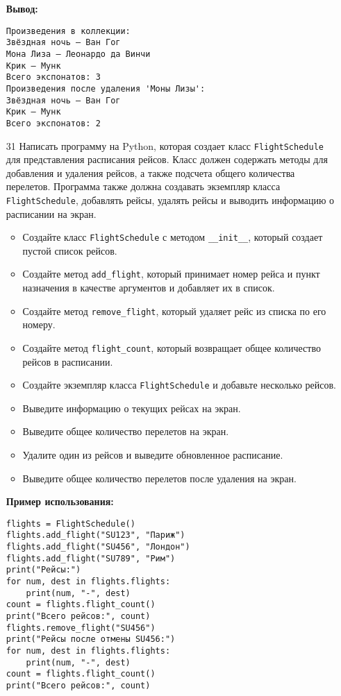 \begin{enumerate}
\textbf{Вывод:}
\begin{verbatim}
Произведения в коллекции:
Звёздная ночь — Ван Гог
Мона Лиза — Леонардо да Винчи
Крик — Мунк
Всего экспонатов: 3
Произведения после удаления 'Моны Лизы':
Звёздная ночь — Ван Гог
Крик — Мунк
Всего экспонатов: 2
\end{verbatim}

\item[31] Написать программу на Python, которая создает класс \texttt{FlightSchedule} для представления расписания рейсов. Класс должен содержать методы для добавления и удаления рейсов, а также подсчета общего количества перелетов. Программа также должна создавать экземпляр класса \texttt{FlightSchedule}, добавлять рейсы, удалять рейсы и выводить информацию о расписании на экран.

\begin{itemize}
    \item Создайте класс \texttt{FlightSchedule} с методом \texttt{\_\_init\_\_}, который создает пустой список рейсов.
    \item Создайте метод \texttt{add\_flight}, который принимает номер рейса и пункт назначения в качестве аргументов и добавляет их в список.
    \item Создайте метод \texttt{remove\_flight}, который удаляет рейс из списка по его номеру.
    \item Создайте метод \texttt{flight\_count}, который возвращает общее количество рейсов в расписании.
    \item Создайте экземпляр класса \texttt{FlightSchedule} и добавьте несколько рейсов.
    \item Выведите информацию о текущих рейсах на экран.
    \item Выведите общее количество перелетов на экран.
    \item Удалите один из рейсов и выведите обновленное расписание.
    \item Выведите общее количество перелетов после удаления на экран.
\end{itemize}

\textbf{Пример использования:}

\begin{verbatim}
flights = FlightSchedule()
flights.add_flight("SU123", "Париж")
flights.add_flight("SU456", "Лондон")
flights.add_flight("SU789", "Рим")
print("Рейсы:")
for num, dest in flights.flights:
    print(num, "-", dest)
count = flights.flight_count()
print("Всего рейсов:", count)
flights.remove_flight("SU456")
print("Рейсы после отмены SU456:")
for num, dest in flights.flights:
    print(num, "-", dest)
count = flights.flight_count()
print("Всего рейсов:", count)
\end{verbatim}


\end{enumerate}
